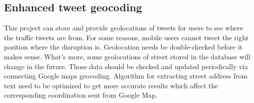 \subsection{Enhanced tweet geocoding}
This project can store and provide geolocations of tweets for users to see where the traffic tweets are from. For some reasons, mobile users cannot tweet the right position where the disruption is. Geolocation needs be double-checked before it makes sense. What's more, some geolocations of street stored in the database will change in the future. Those data should be checked and updated periodically via connecting Google maps geocoding. Algorithm for extracting street address from text need to be optimized to get more accurate results which affect the corresponding coordination sent from Google Map.
